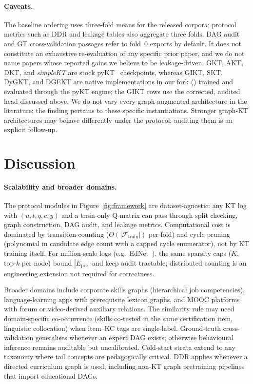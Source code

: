 \documentclass[runningheads]{llncs}
\newcommand{\Epre}{\ensuremath{E_{\text{pre}}}}
\newcommand{\DDR}{\textsc{DDR}}
\begin{document}
\paragraph{Caveats.}
The baseline ordering uses three-fold means for the released corpora; protocol
metrics such as \DDR{} and leakage tables also aggregate three folds. DAG audit and
GT cross-validation passages refer to fold~0 exports by default. It does not
constitute an exhaustive re-evaluation of any specific
prior paper, and we do not name papers whose reported gains we believe
to be leakage-driven. GKT, AKT, DKT, and \textit{simpleKT} are stock
pyKT~\cite{liu2022pykt} checkpoints, whereas GIKT, SKT, DyGKT, and DGEKT are
native implementations in our fork () trained and evaluated
through the pyKT engine; the GIKT rows use the corrected, audited head
discussed above. We do not vary every graph-augmented architecture
in the literature; the finding pertains to these specific instantiations.
Stronger graph-KT architectures
\cite{tong2020skt,dygkt2024,dgekt2024} may behave differently under
the protocol; auditing them is an explicit follow-up.
\section{Discussion}
\label{sec:disc}
\paragraph{Scalability and broader domains.}
The protocol modules in Figure~\ref{fig:framework} are dataset-agnostic:
any KT log with $(u,t,q,c,y)$ and a train-only Q-matrix can pass through
split checking, graph construction, DAG audit, and leakage metrics.
Computational cost is dominated by transition counting
($O(|\mathcal{F}_{\text{train}}|)$ per fold) and cycle pruning
(polynomial in candidate edge count with a capped cycle enumerator), not
by KT training itself. For million-scale logs (e.g.\ EdNet~\cite{choi2020ednet}),
the same sparsity caps ($K$, top-$k$ per node) bound $|\Epre|$ and keep
audit tractable; distributed counting is an engineering extension not
required for correctness.

Broader domains include corporate skills graphs (hierarchical job
competencies), language-learning apps with prerequisite lexicon graphs,
and MOOC platforms with forum or video-derived auxiliary relations. The
similarity rule may need domain-specific co-occurrence (skills co-tested
in the same certification item, linguistic collocation) when item--KC
tags are single-label. Ground-truth cross-validation generalises whenever
an expert DAG exists; otherwise behavioural inference remains auditable
but uncalibrated. Cold-start strata extend to any taxonomy where tail
concepts are pedagogically critical. \DDR{} applies whenever a directed
curriculum graph is used, including non-KT graph pretraining pipelines
that import educational DAGs.
\end{document}
